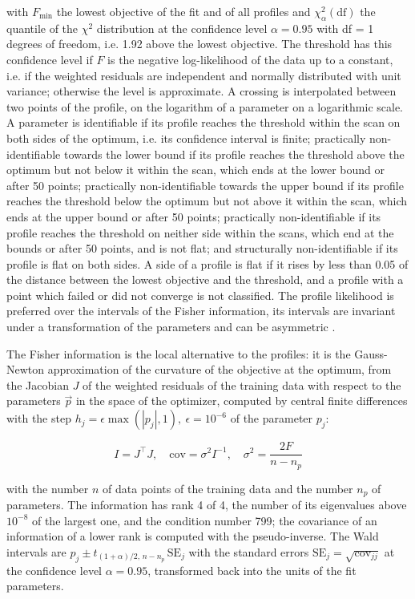 \documentclass{article}
\begin{document}
with $F_{\min}$ the lowest objective of the fit and of all profiles and $\chi^2_{\alpha}(\mathrm{df})$ the quantile of the $\chi^2$ distribution at the confidence level $\alpha = 0.95$ with df = 1 degrees of freedom, i.e. 1.92 above the lowest objective. The threshold has this confidence level if $F$ is the negative log-likelihood of the data up to a constant, i.e. if the weighted residuals are independent and normally distributed with unit variance; otherwise the level is approximate. A crossing is interpolated between two points of the profile, on the logarithm of a parameter on a logarithmic scale. A parameter is identifiable if its profile reaches the threshold within the scan on both sides of the optimum, i.e. its confidence interval is finite; practically non-identifiable towards the lower bound if its profile reaches the threshold above the optimum but not below it within the scan, which ends at the lower bound or after 50 points; practically non-identifiable towards the upper bound if its profile reaches the threshold below the optimum but not above it within the scan, which ends at the upper bound or after 50 points; practically non-identifiable if its profile reaches the threshold on neither side within the scans, which end at the bounds or after 50 points, and is not flat; and structurally non-identifiable if its profile is flat on both sides. A side of a profile is flat if it rises by less than 0.05 of the distance between the lowest objective and the threshold, and a profile with a point which failed or did not converge is not classified. The profile likelihood is preferred over the intervals of the Fisher information, its intervals are invariant under a transformation of the parameters and can be asymmetric \cite{Wieland2021}.

The Fisher information is the local alternative to the profiles: it is the Gauss-Newton approximation of the curvature of the objective at the optimum, from the Jacobian $J$ of the weighted residuals of the training data with respect to the parameters $\vec{p}$ in the space of the optimizer, computed by central finite differences with the step $h_j = \epsilon \max(|p_j|, 1),\ \epsilon = 10^{-6}$ of the parameter $p_j$:

\begin{equation}
I = J^\top J, \quad \mathrm{cov} = \sigma^2 I^{-1}, \quad \sigma^2 = \frac{2 F}{n - n_p}
\end{equation}

with the number $n$ of data points of the training data and the number $n_p$ of parameters. The information has rank 4 of 4, the number of its eigenvalues above $10^{-8}$ of the largest one, and the condition number 799; the covariance of an information of a lower rank is computed with the pseudo-inverse. The Wald intervals are $\hat{p}_j \pm t_{(1+\alpha)/2,\, n-n_p}\, \mathrm{SE}_j$ with the standard errors $\mathrm{SE}_j = \sqrt{\mathrm{cov}_{jj}}$ at the confidence level $\alpha = 0.95$, transformed back into the units of the fit parameters.
\end{document}
